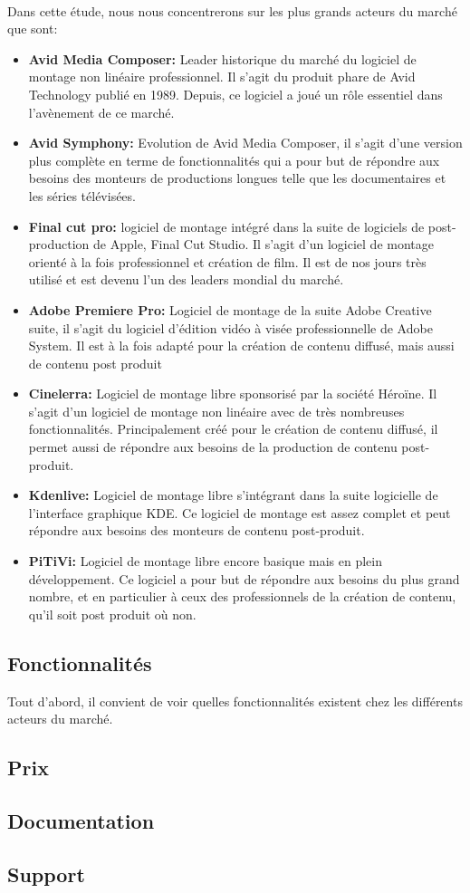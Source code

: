 \paragraph{}
  Dans cette étude, nous nous concentrerons sur les plus grands acteurs du marché que sont:
  \begin{itemize}
    \item{\textbf{Avid Media Composer:} Leader historique du marché du logiciel de montage non linéaire
      professionnel. Il s'agit du produit phare de Avid Technology publié en 1989. Depuis, ce
      logiciel a joué un rôle essentiel dans l'avènement de ce marché.}
    \item{\textbf{Avid Symphony:} Evolution de Avid Media Composer, il s'agit d'une version plus complète en terme
      de fonctionnalités qui a pour but de répondre aux besoins des monteurs de productions longues telle que
      les documentaires et les séries télévisées.}
    \item{\textbf{Final cut pro:} logiciel de montage intégré dans la suite de logiciels de post-production
          de Apple, Final Cut Studio. Il s'agit d'un logiciel de montage orienté à la fois
          professionnel et création de film. Il est de nos jours très utilisé et est devenu l'un
          des leaders mondial du marché.}
    \item{\textbf{Adobe Premiere Pro:} Logiciel de montage de la suite Adobe Creative suite, il s'agit du logiciel
      d'édition vidéo à visée professionnelle de Adobe System. Il est à la fois adapté pour la création
      de contenu diffusé, mais aussi de contenu post produit}
    \item{\textbf{Cinelerra:} Logiciel de montage libre sponsorisé par la société Héroïne. Il s'agit d'un logiciel
      de montage non linéaire avec de très nombreuses fonctionnalités. Principalement créé pour le création de contenu
      diffusé, il permet aussi de répondre aux besoins de la production de contenu post-produit.}
    \item{\textbf{Kdenlive:} Logiciel de montage libre s'intégrant dans la suite logicielle de l'interface graphique KDE.
      Ce logiciel de montage est assez complet et peut répondre aux besoins des monteurs de contenu post-produit.}
    \item{\textbf{PiTiVi:} Logiciel de montage libre encore basique mais en plein développement. Ce logiciel a pour
      but de répondre aux besoins du plus grand nombre, et en particulier à ceux des professionnels de la création de
      contenu, qu'il soit post produit où non.}
  \end{itemize}

\subsection{Fonctionnalités}
  Tout d'abord, il convient de voir quelles fonctionnalités existent chez les différents
  acteurs du marché.
  \subsection{Prix}
  \subsection{Documentation}
  \subsection{Support}
